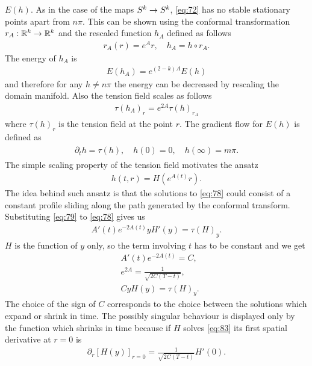 $E(h)$. As in the case of the maps $S^k\rightarrow S^k$, \eqref{eq:72} has no
stable stationary points apart from $n\pi$. This can be shown using
the conformal transformation $r_A:\mathbb{R}^k\rightarrow\mathbb{R}^k$ and the
rescaled function $h_A$ defined as follows
\begin{align}
  \label{eq:75}
  r_A(r)=e^A r,\quad h_A=h\circ r_A.
\end{align}
The energy of $h_A$ is
\begin{align}
  \label{eq:76}
  E(h_A)=e^{(2-k)A}E(h)
\end{align}
and therefore for any $h\ne n\pi$ the energy can be decreased by
rescaling the domain manifold. Also the tension field scales as
follows
\begin{align}
  \label{eq:77}
  \tau(h_A)_r=e^{2A}\tau(h)_{r_A}
\end{align}
where $\tau(h)_r$ is the tension field at the point $r$. The gradient
flow for $E(h)$ is defined as
\begin{align}
  \label{eq:78}
  \begin{split}
    \partial_t h=\tau(h),\quad
    h(0)=0,\quad h(\infty)=m\pi.
  \end{split}
\end{align}
The simple scaling property of the tension field motivates the ansatz
\begin{align}
  \label{eq:79}
  h(t,r)=H(e^{A(t)}r).
\end{align}
The idea behind such ansatz is that the solutions to \eqref{eq:78}
could consist of a constant profile sliding along the path generated
by the conformal transform. Substituting \eqref{eq:79} to
\eqref{eq:78} gives us
\begin{align}
  \label{eq:80}
  A'(t)e^{-2A(t)}yH'(y)=\tau(H)_y.
\end{align}
$H$ is the function of $y$ only, so the term involving $t$ has to be
constant and we get
\begin{align}
  \label{eq:81}
  &A'(t)e^{-2A(t)}=C,\\
  \label{eq:82}
  &e^{2A}=\frac{1}{\sqrt{2C(T-t)}},\\
  \label{eq:83}
  &CyH(y)=\tau(H)_y.
\end{align}
The choice of the sign of $C$ corresponds to the choice between the
solutions which expand or shrink in time. The possibly singular
behaviour is displayed only by the function which shrinks in time
because if $H$ solves \eqref{eq:83} its first spatial derivative at
$r=0$ is
\begin{align}
  \label{eq:84}
  \partial_r\left[ H(y)\right]_{r=0} =\frac{1}{\sqrt{2C(T-t)}}H'(0).
\end{align}
